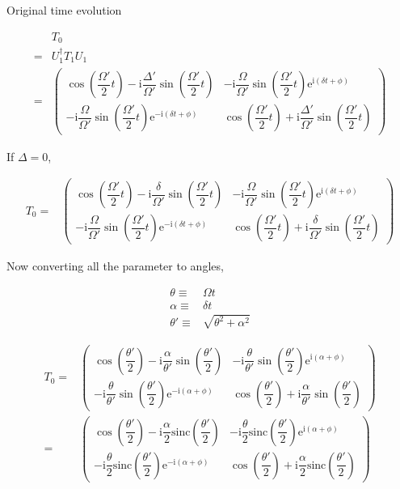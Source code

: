 \documentclass[10pt,fleqn]{article}
\newcommand{\ue}{\mathrm{e}}
\newcommand{\ui}{\mathrm{i}}
\newcommand{\eqar}[1]
{
  \begin{align*}
    #1
  \end{align*}
}
\newcommand{\paren}[1]{{\left({#1}\right)}}
\begin{document}
Original time evolution
\eqar{
  &T_0\\
  =&U_1^\dagger T_1 U_1\\
  =&\begin{pmatrix}
    \cos\paren{\dfrac{\Omega'}{2}t}-\ui\dfrac{\Delta'}{\Omega'}\sin\paren{\dfrac{\Omega'}{2}t}&
                                                                                                -\ui\dfrac{\Omega}{\Omega'}\sin\paren{\dfrac{\Omega'}{2}t}\ue^{\ui\paren{\delta t + \phi}}\\
    -\ui\dfrac{\Omega}{\Omega'}\sin\paren{\dfrac{\Omega'}{2}t}\ue^{-\ui\paren{\delta t + \phi}}&\cos\paren{\dfrac{\Omega'}{2}t}+\ui\dfrac{\Delta'}{\Omega'}\sin\paren{\dfrac{\Omega'}{2}t}
  \end{pmatrix}
}

If $\Delta=0$,
\eqar{
  T_0=&\begin{pmatrix}
    \cos\paren{\dfrac{\Omega'}{2}t}-\ui\dfrac{\delta}{\Omega'}\sin\paren{\dfrac{\Omega'}{2}t}&
                                                                                               -\ui\dfrac{\Omega}{\Omega'}\sin\paren{\dfrac{\Omega'}{2}t}\ue^{\ui\paren{\delta t + \phi}}\\
    -\ui\dfrac{\Omega}{\Omega'}\sin\paren{\dfrac{\Omega'}{2}t}\ue^{-\ui\paren{\delta t + \phi}}&\cos\paren{\dfrac{\Omega'}{2}t}+\ui\dfrac{\delta}{\Omega'}\sin\paren{\dfrac{\Omega'}{2}t}
  \end{pmatrix}
}
Now converting all the parameter to angles,
\eqar{
  \theta\equiv&\Omega t\\
  \alpha\equiv&\delta t\\
  \theta'\equiv&\sqrt{\theta^2+\alpha^2}
}
\eqar{
  T_0=&\begin{pmatrix}
    \cos\paren{\dfrac{\theta'}{2}}-\ui\dfrac{\alpha}{\theta'}\sin\paren{\dfrac{\theta'}{2}}&
                                                                                             -\ui\dfrac{\theta}{\theta'}\sin\paren{\dfrac{\theta'}{2}}\ue^{\ui\paren{\alpha + \phi}}\\
    -\ui\dfrac{\theta}{\theta'}\sin\paren{\dfrac{\theta'}{2}}\ue^{-\ui\paren{\alpha + \phi}}&\cos\paren{\dfrac{\theta'}{2}}+\ui\dfrac{\alpha}{\theta'}\sin\paren{\dfrac{\theta'}{2}}
  \end{pmatrix}\\
  =&\begin{pmatrix}
    \cos\paren{\dfrac{\theta'}{2}}-\ui\dfrac{\alpha}{2}\mathrm{sinc}\paren{\dfrac{\theta'}{2}}&
                                                                                                -\ui\dfrac{\theta}{2}\mathrm{sinc}\paren{\dfrac{\theta'}{2}}\ue^{\ui\paren{\alpha + \phi}}\\
    -\ui\dfrac{\theta}{2}\mathrm{sinc}\paren{\dfrac{\theta'}{2}}\ue^{-\ui\paren{\alpha + \phi}}&\cos\paren{\dfrac{\theta'}{2}}+\ui\dfrac{\alpha}{2}\mathrm{sinc}\paren{\dfrac{\theta'}{2}}
  \end{pmatrix}
}
\end{document}
